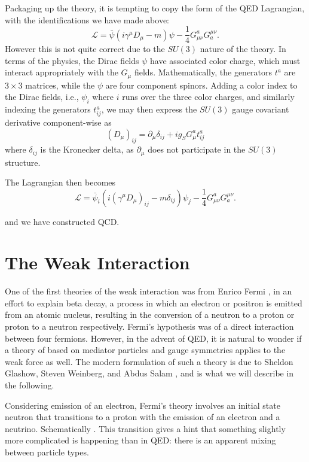 Packaging up the theory, it is tempting to copy the form of the QED Lagrangian,
with the identifications we have made above:
\begin{equation}
\mathcal{L} = \bar{\psi}(i\gamma^{\mu}D_{\mu} - m)\psi -\frac{1}{4} G_{\mu\nu}^{a}G^{\mu\nu}_{a}.
\end{equation}
However this is not quite correct due to the $SU(3)$ nature of the theory. In terms of the physics,
the Dirac fields $\psi$ have associated color charge, which must interact appropriately with the 
$G_{\mu}$ fields. Mathematically, the generators $t^{a}$ are $3\times 3$ matrices, while the $\psi$ are
four component spinors. Adding a color index to the Dirac fields, i.e., $\psi_{i}$ where $i$ runs over 
the three color charges, and similarly indexing the generators $t_{ij}^{a}$, we may then express the 
$SU(3)$ gauge covariant derivative component-wise as 
\begin{equation}
(D_{\mu})_{ij} = \partial_{\mu}\delta_{ij} + ig_{S}G_{\mu}^{a}t^{a}_{ij}
\end{equation}
where $\delta_{ij}$ is the Kronecker delta, as $\partial_{\mu}$ does not participate in the $SU(3)$
structure.

The Lagrangian then becomes
\begin{equation}
\mathcal{L} = \bar{\psi}_{i}(i(\gamma^{\mu}D_{\mu})_{ij} - m\delta_{ij})\psi_{j} -\frac{1}{4} G_{\mu\nu}^{a}G^{\mu\nu}_{a}.
\end{equation}

and we have constructed QCD.


\section{The Weak Interaction}
One of the first theories of the weak interaction was from Enrico Fermi , in an effort to 
explain beta decay, a process in which an electron or positron is emitted from an atomic nucleus, resulting 
in the conversion of a neutron to a proton or proton to a neutron respectively. Fermi's hypothesis was 
of a direct interaction between four fermions. However, in the advent of QED, it is natural to wonder if 
a theory of based on mediator particles and gauge symmetries applies to the weak force as well. The modern formulation 
of such a theory is due to Sheldon Glashow, Steven Weinberg, and Abdus Salam , and is what we will 
describe in the following.

Considering emission of an electron, Fermi's theory involves an initial state neutron that transitions 
to a proton with the emission of an electron and a neutrino. Schematically . 
This transition gives a hint that something slightly more complicated is happening than in QED: there is 
an apparent mixing between particle types. 

